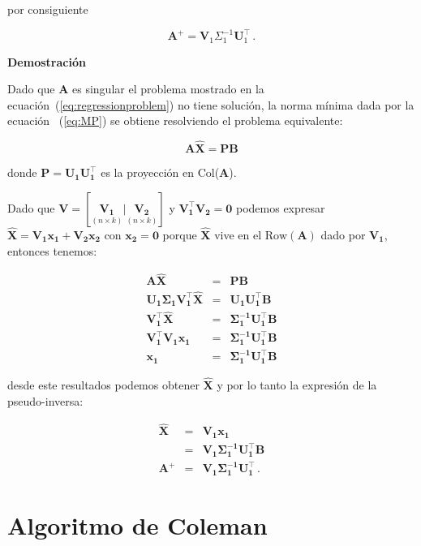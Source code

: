 \noindent por consiguiente

\begin{equation}
\label{eq:pseudoinversesvd}
\mathbf{A}^{\!\!+} = \mathbf{V}_1 \Sigma_1^{-1} \mathbf{U}_1^\top \, .
\end{equation}


\textbf{Demostración}\quad

Dado que $\mathbf{A}$ es singular el problema mostrado en la ecuación~(\ref{eq:regressionproblem}) 
no tiene solución, la norma mínima dada por la ecuación ~(\ref{eq:MP}) se obtiene resolviendo
el problema equivalente:

\begin{equation*}
\label{eq:proyectorsol}
\mathbf{A \hat{X} = PB} 
\end{equation*}

\noindent donde $\mathbf{P=U_1 U_1^\top}$ es la proyección en Col($\mathbf{A}$).

Dado que $\mathbf{V} = [\underset{(n \times k)}{\mathbf{V_1}} |
\underset{(n \times k)}{\mathbf{V_2}}]$ y $\mathbf{V_1^\top V_2 =
0}$ podemos expresar $\mathbf{\hat{X}} = \mathbf{V_1 x_1 + V_2 x_2}$
con $\mathbf{x_2=0}$ porque $\mathbf{\hat{X}}$ vive en el
$\text{Row}(\mathbf{A})$ dado por $\mathbf{V_1}$, entonces tenemos:

\begin{eqnarray*}
\mathbf{A \hat{X}} &=& \mathbf{PB} \\
\mathbf{U_1 \Sigma_1 V_1^\top \hat{X}} &=& \mathbf{U_1 U_1^\top B} \\
\mathbf{ V_1^\top \hat{X}} &=&  \mathbf{\Sigma_1^{-1} U_1^\top B} \\ 
\mathbf{ V_1^\top V_1 x_1} &=& \mathbf{\Sigma_1^{-1}
U_1^\top B} \\
\mathbf{x_1}&=& \mathbf{\Sigma_1^{-1} U_1^\top B}
\end{eqnarray*}

\noindent desde este resultados podemos obtener $\mathbf{\hat{X}}$ y
por lo tanto la expresión de la pseudo-inversa:

\begin{eqnarray*}
\mathbf{\hat{X}} &=& \mathbf{V_1 x_1} \\
                &=& \mathbf{V_1 \Sigma_1^{-1} U_1^\top B} \\
\mathbf{A^+} &=& \mathbf{V_1 \Sigma_1^{-1} U_1^\top} \, .
\end{eqnarray*}

\section{Algoritmo de Coleman}
\label{sec:RR}

